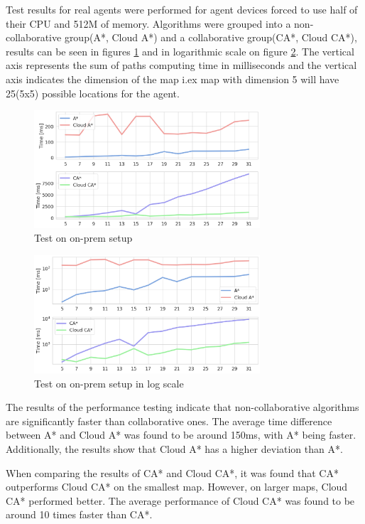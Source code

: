 Test results for real agents were performed for agent devices forced to use half of their CPU and 512M of memory. Algorithms were grouped into a non-collaborative group(A*, Cloud A*) and a collaborative group(CA*, Cloud CA*), results can be seen in figures \ref{fig:on_prem_test_time} and in logarithmic scale on figure \ref{fig:on_prem_test_time_log}. The vertical axis represents the sum of paths computing time in milliseconds and the vertical axis indicates the dimension of the map i.ex map with dimension 5 will have 25(5x5) possible locations for the agent.

\begin{figure}
    \centering
    \includegraphics[width=0.75\textwidth]{pictures/on_prem_test_time.png}
    \caption{Test on on-prem setup}
    \label{fig:on_prem_test_time}
\end{figure}
\begin{figure}
    \centering
    \includegraphics[width=0.75\textwidth]{pictures/on_prem_test_time_log.png}
    \caption{Test on on-prem setup in log scale}
    \label{fig:on_prem_test_time_log}
\end{figure}

The results of the performance testing indicate that non-collaborative algorithms are significantly faster than collaborative ones. The average time difference between A* and Cloud A* was found to be around 150ms, with A* being faster. Additionally, the results show that Cloud A* has a higher deviation than A*.

When comparing the results of CA* and Cloud CA*, it was found that CA* outperforms Cloud CA* on the smallest map. However, on larger maps, Cloud CA* performed better. The average performance of Cloud CA* was found to be around 10 times faster than CA*.